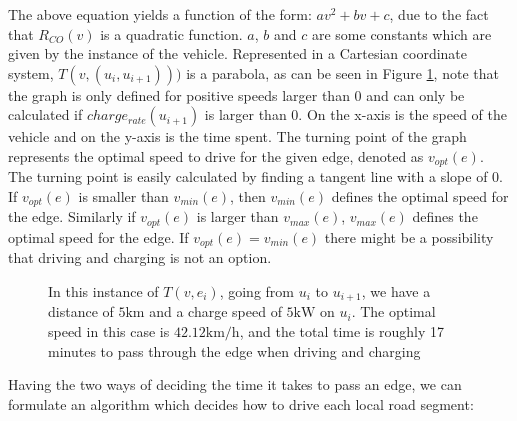 The above equation yields a function of the form: $av^2 + bv + c$, due to the fact that $R_{CO}(v)$ is a quadratic function. $a$, $b$ and $c$ are some constants which are given by the instance of the vehicle. Represented in a Cartesian coordinate system, $T(v,(u_i, u_{i+1})))$ is a parabola, as can be seen in Figure \ref{fig:graph}, note that the graph is only defined for positive speeds larger than $0$ and can only be calculated if $charge_{rate}(u_{i+1})$ is larger than $0$. On the x-axis is the speed of the vehicle and on the y-axis is the time spent. The turning point of the graph represents the optimal speed to drive for the given edge, denoted as $v_{opt}(e)$. The turning point is easily calculated by finding a tangent line with a slope of $0$. If $v_{opt}(e)$ is smaller than $v_{min}(e)$, then $v_{min}(e)$ defines the optimal speed for the edge. Similarly if $v_{opt}(e)$ is larger than $v_{max}(e)$, $v_{max}(e)$ defines the optimal speed for the edge. If $v_{opt}(e) = v_{min}(e)$ there might be a possibility that driving and charging is not an option. 

\begin{figure}[!htb]
\label{fig:graph}
% 
\caption{In this instance of $T(v,e_i)$, going from $u_i$ to $u_{i+1}$, we have a distance of $5 \si{\km}$ and a charge speed of $5 \si{\kW}$ on $u_i$. The optimal speed in this case is $42.12\si{\km\per\hour}$, and the total time is roughly 17 minutes to pass through the edge when driving and charging}
\label{fig:graph}
\end{figure}
Having the two ways of deciding the time it takes to pass an edge, we can formulate an algorithm which decides how to drive each local road segment:


